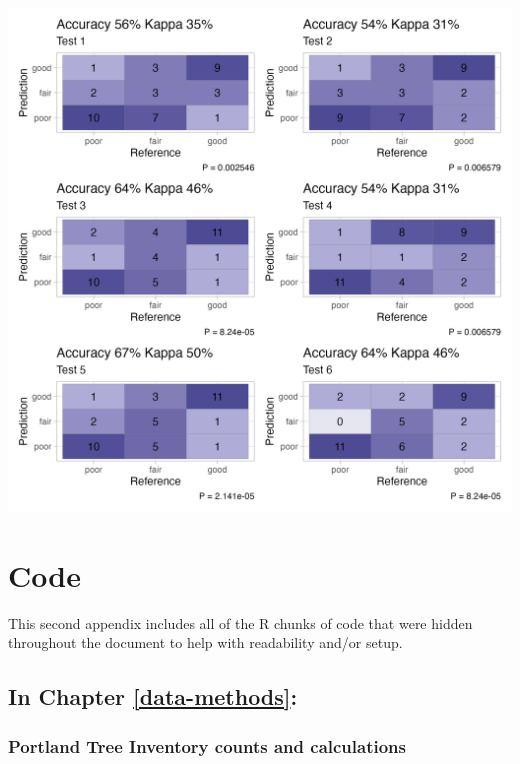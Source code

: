\documentclass[12pt,twoside]{reedthesis}
\begin{document}
\includegraphics[width=1\linewidth]{figure/test}

\hypertarget{code-chunks}{%
\chapter{Code}\label{code-chunks}}

This second appendix includes all of the R chunks of code that were hidden throughout the document to help with readability and/or setup.

\hypertarget{in-chapter-refdata-methods}{%
\section{\texorpdfstring{\textbf{In Chapter} \ref{data-methods}\textbf{:}}{In Chapter \ref{data-methods}:}}\label{in-chapter-refdata-methods}}

\hypertarget{portland-tree-inventory-counts-and-calculations}{%
\subsection*{Portland Tree Inventory counts and calculations}\label{portland-tree-inventory-counts-and-calculations}}
\end{document}
